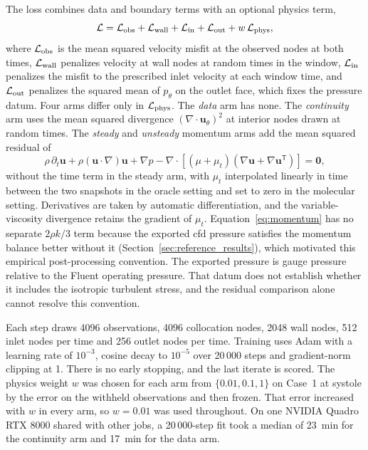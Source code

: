 \documentclass[12pt,a4paper]{article}
\newcommand{\cfdrevision}[1]{#1} %
\newcommand{\CFD}{\ac{cfd}\xspace}
\theoremstyle{definition}
\numberwithin{equation}{section}
\providecommand{\DIFaddtex}[1]{{\protect\color{blue} \sf #1}} %
\providecommand{\DIFdeltex}[1]{{\protect\color{red} \scriptsize #1}} %
\providecommand{\DIFaddbegin}{} %
\providecommand{\DIFaddend}{} %
\providecommand{\DIFdelbegin}{} %
\providecommand{\DIFdelend}{} %
\providecommand{\DIFadd}[1]{\texorpdfstring{\DIFaddtex{#1}}{#1}} %
\providecommand{\DIFdel}[1]{\texorpdfstring{\DIFdeltex{#1}}{}} %
\newcommand{\DIFscaledelfig}{0.5}
\newlength{\DIFdelgraphicswidth} %
\newlength{\DIFdelgraphicsheight} %
\newcommand{\DIFaddincludegraphics}[2][]{{\color{blue}\fbox{\DIFOincludegraphics[#1]{#2}}}} %
\newcommand{\DIFdelincludegraphics}[2][]{%
\sbox{\DIFdelgraphicsbox}{\DIFOincludegraphics[#1]{#2}}%
\settoboxwidth{\DIFdelgraphicswidth}{\DIFdelgraphicsbox} %
\settoboxtotalheight{\DIFdelgraphicsheight}{\DIFdelgraphicsbox} %
\scalebox{\DIFscaledelfig}{%
\parbox[b]{\DIFdelgraphicswidth}{\usebox{\DIFdelgraphicsbox}\\[-\baselineskip] \rule{\DIFdelgraphicswidth}{0em}}\llap{\resizebox{\DIFdelgraphicswidth}{\DIFdelgraphicsheight}{%
\setlength{\unitlength}{\DIFdelgraphicswidth}%
\begin{picture}(1,1)%
\thicklines\linethickness{2pt} %
{\color[rgb]{1,0,0}\put(0,0){\framebox(1,1){}}}%
{\color[rgb]{1,0,0}\put(0,0){\line( 1,1){1}}}%
{\color[rgb]{1,0,0}\put(0,1){\line(1,-1){1}}}%
\end{picture}%
}\hspace*{3pt}}} %
} %
\DeclareRobustCommand{\DIFaddbegin}{\DIFOaddbegin \let\includegraphics\DIFaddincludegraphics} %
\DeclareRobustCommand{\DIFaddend}{\DIFOaddend \let\includegraphics\DIFOincludegraphics} %
\DeclareRobustCommand{\DIFdelbegin}{\DIFOdelbegin \let\includegraphics\DIFdelincludegraphics} %
\DeclareRobustCommand{\DIFdelend}{\DIFOaddend \let\includegraphics\DIFOincludegraphics} %
\renewcommand{\DIFaddtex}[1]{{\protect\color{red}#1}}
\renewcommand{\DIFdeltex}[1]{}
\renewcommand{\DIFdel}[1]{}
\renewcommand{\DIFaddincludegraphics}[2][]{\DIFOincludegraphics[#1]{#2}}
\renewcommand{\DIFdelincludegraphics}[2][]{}
\renewcommand{\cfdrevision}[1]{\textcolor{red}{#1}}
\def\DIFaddbegin{}\def\DIFaddend{}%
\def\DIFdelbegin{}\def\DIFdelend{}%
\def\cfdrevision#1{#1}%
\begin{document}
The loss combines data and boundary terms with an optional physics term,
\begin{equation}
\mathcal L=\mathcal L_{\rm obs}+\mathcal L_{\rm wall}+\mathcal L_{\rm in}+\mathcal L_{\rm out}+w\,\mathcal L_{\rm phys},
\label{eq:loss}
\end{equation}
where $\mathcal L_{\rm obs}$ is the mean squared velocity misfit at the observed nodes at both times, $\mathcal L_{\rm wall}$ penalizes velocity at wall nodes at random times in the window, $\mathcal L_{\rm in}$ penalizes the misfit to the prescribed inlet velocity at each window time, and $\mathcal L_{\rm out}$ penalizes the squared mean of $p_\theta$ on the outlet face, which fixes the pressure datum. Four arms differ only in $\mathcal L_{\rm phys}$. The \emph{data} arm has none. The \emph{continuity} arm uses the mean squared divergence $(\nabla\cdot\mathbf u_\theta)^2$ at interior nodes drawn at random times. The \emph{steady} and \emph{unsteady} momentum arms add the mean squared residual of
\begin{equation}
\rho\,\partial_t\mathbf u+\rho(\mathbf u\cdot\nabla)\mathbf u
+\nabla p-\nabla\cdot\left[(\mu+\mu_t)
(\nabla\mathbf u+\nabla\mathbf u^{\mathsf T})\right]=\mathbf 0,
\label{eq:momentum}
\end{equation}
without the time term in the steady arm, with $\mu_t$ interpolated linearly in time between the two snapshots in the oracle setting and set to zero in the molecular setting. Derivatives are taken by automatic differentiation, and the variable-viscosity divergence retains the gradient of $\mu_t$. Equation~\eqref{eq:momentum} has no separate $2\rho k/3$ term because the exported \CFD pressure satisfies the momentum balance better without it (Section~\ref{sec:reference_results}), \DIFdelbegin \DIFdel{indicating that the isotropic turbulent stress is already contained in the exported pressure. }\DIFdelend \DIFaddbegin \DIFadd{which motivated this empirical post-processing convention. \cfdrevision{The exported pressure is gauge pressure relative to the Fluent operating pressure. That datum does not establish whether it includes the isotropic turbulent stress, and the residual comparison alone cannot resolve this convention.}
}\DIFaddend 

Each step draws 4096 observations, 4096 collocation nodes, 2048 wall nodes, 512 inlet nodes per time and 256 outlet nodes per time. Training uses Adam with a learning rate of $10^{-3}$, cosine decay to $10^{-5}$ over 20\,000 steps and gradient-norm clipping at 1. There is no early stopping, and the last iterate is scored. The physics weight $w$ was chosen for each arm from $\{0.01,0.1,1\}$ on Case~1 at systole by the error on the withheld observations and then frozen. That error increased with $w$ in every arm, so $w=0.01$ was used throughout. On one NVIDIA Quadro RTX 8000 shared with other jobs, a 20\,000-step fit took a median of 23~min for the continuity arm and 17~min for the data arm.
\end{document}
